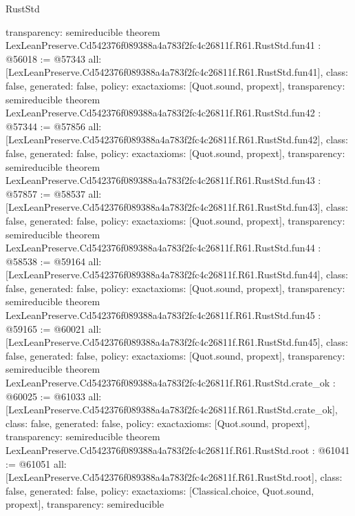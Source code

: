 \begin{lexlean}{RustStd}
\begin{coremodule}
{  transparency: semireducible
}
theorem LexLeanPreserve.Cd542376f089388a4a783f2fc4c26811f.R61.RustStd.fun41 : @56018 := @57343 {
  all: [LexLeanPreserve.Cd542376f089388a4a783f2fc4c26811f.R61.RustStd.fun41],
  class: false,
  generated: false,
  policy: exact{axioms: [Quot.sound, propext]},
  transparency: semireducible
}
theorem LexLeanPreserve.Cd542376f089388a4a783f2fc4c26811f.R61.RustStd.fun42 : @57344 := @57856 {
  all: [LexLeanPreserve.Cd542376f089388a4a783f2fc4c26811f.R61.RustStd.fun42],
  class: false,
  generated: false,
  policy: exact{axioms: [Quot.sound, propext]},
  transparency: semireducible
}
theorem LexLeanPreserve.Cd542376f089388a4a783f2fc4c26811f.R61.RustStd.fun43 : @57857 := @58537 {
  all: [LexLeanPreserve.Cd542376f089388a4a783f2fc4c26811f.R61.RustStd.fun43],
  class: false,
  generated: false,
  policy: exact{axioms: [Quot.sound, propext]},
  transparency: semireducible
}
theorem LexLeanPreserve.Cd542376f089388a4a783f2fc4c26811f.R61.RustStd.fun44 : @58538 := @59164 {
  all: [LexLeanPreserve.Cd542376f089388a4a783f2fc4c26811f.R61.RustStd.fun44],
  class: false,
  generated: false,
  policy: exact{axioms: [Quot.sound, propext]},
  transparency: semireducible
}
theorem LexLeanPreserve.Cd542376f089388a4a783f2fc4c26811f.R61.RustStd.fun45 : @59165 := @60021 {
  all: [LexLeanPreserve.Cd542376f089388a4a783f2fc4c26811f.R61.RustStd.fun45],
  class: false,
  generated: false,
  policy: exact{axioms: [Quot.sound, propext]},
  transparency: semireducible
}
theorem LexLeanPreserve.Cd542376f089388a4a783f2fc4c26811f.R61.RustStd.crate_ok : @60025 := @61033 {
  all: [LexLeanPreserve.Cd542376f089388a4a783f2fc4c26811f.R61.RustStd.crate_ok],
  class: false,
  generated: false,
  policy: exact{axioms: [Quot.sound, propext]},
  transparency: semireducible
}
theorem LexLeanPreserve.Cd542376f089388a4a783f2fc4c26811f.R61.RustStd.root : @61041 := @61051 {
  all: [LexLeanPreserve.Cd542376f089388a4a783f2fc4c26811f.R61.RustStd.root],
  class: false,
  generated: false,
  policy: exact{axioms: [Classical.choice, Quot.sound, propext]},
  transparency: semireducible
}


\end{coremodule}
\end{lexlean}
